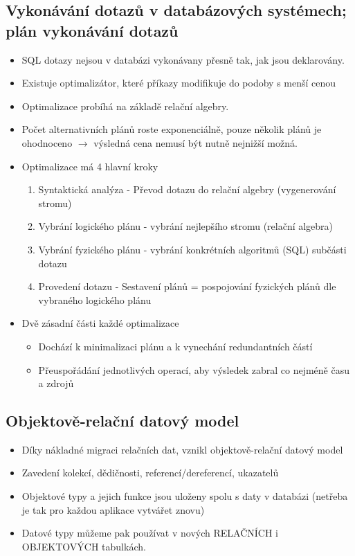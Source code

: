 \documentclass[10pt,a4paper]{article}
\begin{document}
\subsection{Vykonávání dotazů v databázových systémech; plán vykonávání dotazů}
\begin{itemize}
\item SQL dotazy nejsou v databázi vykonávany přesně tak, jak jsou deklarovány.
\item Existuje optimalizátor, které příkazy modifikuje do podoby s menší cenou
\item Optimalizace probíhá na základě relační algebry.
\item Počet alternativních plánů roste exponenciálně, pouze několik plánů je ohodnoceno $\rightarrow$ výsledná cena nemusí být nutně nejnižší možná.
\item Optimalizace má 4 hlavní kroky
\begin{enumerate}
\item Syntaktická analýza - Převod dotazu do relační algebry (vygenerování stromu)
\item Vybrání logického plánu - vybrání nejlepšího stromu (relační algebra)
\item Vybrání fyzického plánu - vybrání konkrétních algoritmů (SQL) subčásti dotazu
\item Provedení dotazu - Sestavení plánů = pospojování fyzických plánů dle vybraného logického plánu
\end{enumerate}
\item Dvě zásadní části každé optimalizace
\begin{itemize}
\item Dochází k minimalizaci plánu a k vynechání redundantních částí
\item Přeuspořádání jednotlivých operací, aby výsledek zabral co nejméně času a zdrojů
\end{itemize}
\end{itemize}

\subsection{Objektově‐relační datový model}
\begin{itemize}
\item Díky nákladné migraci relačních dat, vznikl objektově-relační datový model
\item Zavedení kolekcí, dědičnosti, referencí/dereferencí, ukazatelů
\item Objektové typy a jejich funkce jsou uloženy spolu s daty v databázi (netřeba je tak pro každou aplikace vytvářet znovu)
\item Datové typy můžeme pak používat v nových RELAČNÍCH i OBJEKTOVÝCH tabulkách.
\end{itemize}
\end{document}
